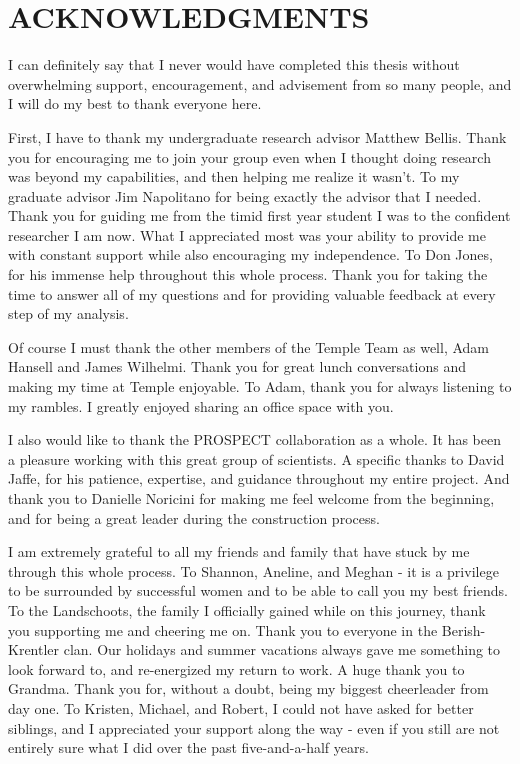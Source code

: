 \chapter*{ACKNOWLEDGMENTS}

I can definitely say that I never would have completed this thesis without overwhelming support, encouragement, and advisement from so many people, and I will do my best to thank everyone here. 

First, I have to thank my undergraduate research advisor Matthew Bellis. 
Thank you for encouraging me to join your group even when I thought doing research was beyond my capabilities, and then helping me realize it wasn't.
To my graduate advisor Jim Napolitano for being exactly the advisor that I needed. 
Thank you for guiding me from the timid first year student I was to the confident researcher I am now. 
What I appreciated most was your ability to provide me with constant support while also encouraging my independence.
To Don Jones, for his immense help throughout this whole process.
Thank you for taking the time to answer all of my questions and for providing valuable feedback at every step of my analysis.

Of course I must thank the other members of the Temple Team as well, Adam Hansell and James Wilhelmi.
Thank you for great lunch conversations and making my time at Temple enjoyable. 
To Adam, thank you for always listening to my rambles. I greatly enjoyed sharing an office space with you. 

I also would like to thank the PROSPECT collaboration as a whole. It has been a pleasure working with this great group of scientists. 
A specific thanks to David Jaffe, for his patience, expertise, and guidance throughout my entire project. 
And thank you to Danielle Noricini for making me feel welcome from the beginning, and for being a great leader during the construction process. 

I am extremely grateful to all my friends and family that have stuck by me through this whole process.
To Shannon, Aneline, and Meghan - it is a privilege to be surrounded by successful women and to be able to call you my best friends.
To the Landschoots, the family I officially gained while on this journey, thank you supporting me and cheering me on. 
Thank you to everyone in the Berish-Krentler clan. Our holidays and summer vacations always gave me something to look forward to, and re-energized my return to work.
A huge thank you to Grandma. Thank you for, without a doubt, being my biggest cheerleader from day one. 
To Kristen, Michael, and Robert, I could not have asked for better siblings, and I appreciated your support along the way - even if you still are not entirely sure what I did over the past five-and-a-half years.

